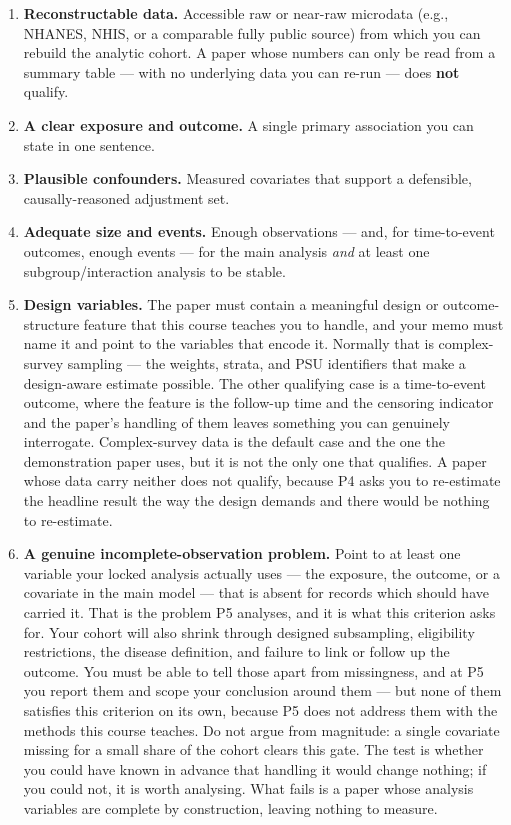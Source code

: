 \documentclass[
]{article}
\newcounter{none} %
\providecommand{\tightlist}{%
  \setlength{\itemsep}{0pt}\setlength{\parskip}{0pt}}
\begin{document}
\begin{enumerate}
\def\labelenumi{\arabic{enumi}.}
\tightlist
\item
  \textbf{Reconstructable data.} Accessible raw or near-raw microdata
  (e.g., NHANES, NHIS, or a comparable fully public source) from which
  you can rebuild the analytic cohort. A paper whose numbers can only be
  read from a summary table --- with no underlying data you can re-run
  --- does \textbf{not} qualify.
\item
  \textbf{A clear exposure and outcome.} A single primary association
  you can state in one sentence.
\item
  \textbf{Plausible confounders.} Measured covariates that support a
  defensible, causally-reasoned adjustment set.
\item
  \textbf{Adequate size and events.} Enough observations --- and, for
  time-to-event outcomes, enough events --- for the main analysis
  \emph{and} at least one subgroup/interaction analysis to be stable.
\item
  \textbf{Design variables.} The paper must contain a meaningful design
  or outcome-structure feature that this course teaches you to handle,
  and your memo must name it and point to the variables that encode it.
  Normally that is complex-survey sampling --- the weights, strata, and
  PSU identifiers that make a design-aware estimate possible. The other
  qualifying case is a time-to-event outcome, where the feature is the
  follow-up time and the censoring indicator and the paper's handling of
  them leaves something you can genuinely interrogate. Complex-survey
  data is the default case and the one the demonstration paper uses, but
  it is not the only one that qualifies. A paper whose data carry
  neither does not qualify, because P4 asks you to re-estimate the
  headline result the way the design demands and there would be nothing
  to re-estimate.
\item
  \textbf{A genuine incomplete-observation problem.} Point to at least
  one variable your locked analysis actually uses --- the exposure, the
  outcome, or a covariate in the main model --- that is absent for
  records which should have carried it. That is the problem P5 analyses,
  and it is what this criterion asks for. Your cohort will also shrink
  through designed subsampling, eligibility restrictions, the disease
  definition, and failure to link or follow up the outcome. You must be
  able to tell those apart from missingness, and at P5 you report them
  and scope your conclusion around them --- but none of them satisfies
  this criterion on its own, because P5 does not address them with the
  methods this course teaches. Do not argue from magnitude: a single
  covariate missing for a small share of the cohort clears this gate.
  The test is whether you could have known in advance that handling it
  would change nothing; if you could not, it is worth analysing. What
  fails is a paper whose analysis variables are complete by
  construction, leaving nothing to measure.
\end{enumerate}
\end{document}
